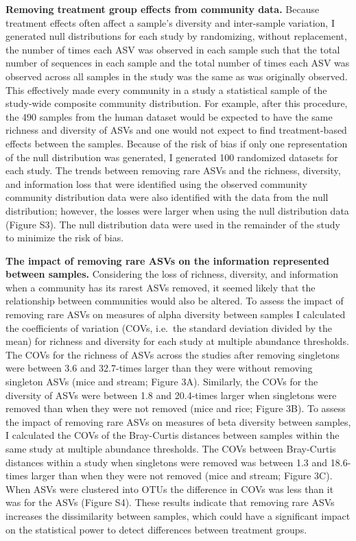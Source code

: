 \documentclass[]{article}
\begin{document}
\textbf{Removing treatment group effects from community data.} Because
treatment effects often affect a sample's diversity and inter-sample
variation, I generated null distributions for each study by randomizing,
without replacement, the number of times each ASV was observed in each
sample such that the total number of sequences in each sample and the
total number of times each ASV was observed across all samples in the
study was the same as was originally observed. This effectively made
every community in a study a statistical sample of the study-wide
composite community distribution. For example, after this procedure, the
490 samples from the human dataset would be expected to have the same
richness and diversity of ASVs and one would not expect to find
treatment-based effects between the samples. Because of the risk of bias
if only one representation of the null distribution was generated, I
generated 100 randomized datasets for each study. The trends between
removing rare ASVs and the richness, diversity, and information loss
that were identified using the observed community community distribution
data were also identified with the data from the null distribution;
however, the losses were larger when using the null distribution data
(Figure S3). The null distribution data were used in the remainder of
the study to minimize the risk of bias.

\textbf{The impact of removing rare ASVs on the information represented
between samples.} Considering the loss of richness, diversity, and
information when a community has its rarest ASVs removed, it seemed
likely that the relationship between communities would also be altered.
To assess the impact of removing rare ASVs on measures of alpha
diversity between samples I calculated the coefficients of variation
(COVs, i.e.~the standard deviation divided by the mean) for richness and
diversity for each study at multiple abundance thresholds. The COVs for
the richness of ASVs across the studies after removing singletons were
between 3.6 and 32.7-times larger than they were without removing
singleton ASVs (mice and stream; Figure 3A). Similarly, the COVs for the
diversity of ASVs were between 1.8 and 20.4-times larger when singletons
were removed than when they were not removed (mice and rice; Figure 3B).
To assess the impact of removing rare ASVs on measures of beta diversity
between samples, I calculated the COVs of the Bray-Curtis distances
between samples within the same study at multiple abundance thresholds.
The COVs between Bray-Curtis distances within a study when singletons
were removed was between 1.3 and 18.6-times larger than when they were
not removed (mice and stream; Figure 3C). When ASVs were clustered into
OTUs the difference in COVs was less than it was for the ASVs (Figure
S4). These results indicate that removing rare ASVs increases the
dissimilarity between samples, which could have a significant impact on
the statistical power to detect differences between treatment groups.
\end{document}
